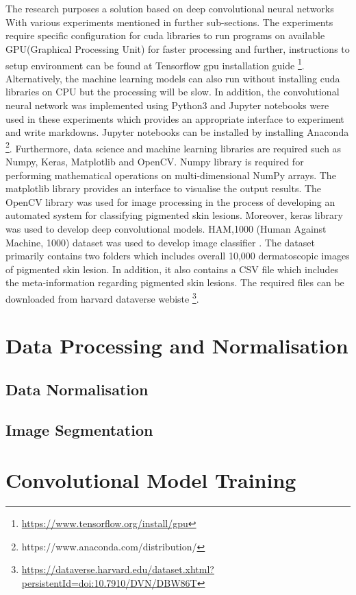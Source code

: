 \section*{}
The research purposes a solution based on deep convolutional neural networks
With various experiments mentioned in further sub-sections.  The experiments
require specific configuration for cuda libraries to run programs on available GPU(Graphical Processing Unit) for faster processing
and further, instructions to setup environment can be found at Tensorflow gpu installation guide \footnote[1]{\url{https://www.tensorflow.org/install/gpu}}.
Alternatively, the machine learning models can also run without installing cuda libraries on CPU but the processing will be slow.
In addition, the convolutional neural network was implemented using Python3 and Jupyter notebooks were used in these experiments which provides an appropriate interface to experiment and write markdowns.  
Jupyter notebooks can be installed by installing Anaconda \footnote[2]{https://www.anaconda.com/distribution/}.
Furthermore, data science and machine learning libraries are required such as Numpy, Keras, Matplotlib and OpenCV. 
Numpy library is required for performing mathematical operations on multi-dimensional NumPy arrays. The matplotlib library provides an interface to visualise the output results. 
The OpenCV library was used for image processing in the process of developing an automated system for classifying
pigmented skin lesions. Moreover, keras library was used to develop deep convolutional models. 
HAM,1000 (Human Against Machine, 1000) dataset was used to develop image classifier \citep{DVN/DBW86T_2018}.
The dataset primarily contains two folders which includes overall 10,000 dermatoscopic images of pigmented skin lesion. In addition, it also contains a CSV file which includes the meta-information regarding pigmented skin lesions.
The required files can be downloaded from harvard dataverse webiste \footnote[3]{\url{https://dataverse.harvard.edu/dataset.xhtml?persistentId=doi:10.7910/DVN/DBW86T}}.

\pagebreak
\section{Data Processing and Normalisation}

\subsection{Data Normalisation}

\subsection{ Image Segmentation }

\pagebreak
\section{Convolutional Model Training}

